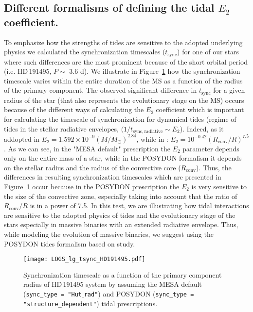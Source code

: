 \documentclass{aa}
\DeclareRobustCommand{\Figref}[1]{Figure~\ref{#1}}
\begin{document}
\begin{appendix}
\section{Different formalisms of defining the tidal $E_{2}$ coefficient.}
\label{sec:e2_def}
To emphasize how the strengths of tides are sensitive to the adopted underlying physics we calculated the synchronization timescales ($t_\mathrm{sync}$) for one of our stars where such differences are the most prominent because of the short orbital period (i.e. HD\,191495, $P \sim$ 3.6 d).
We illustrate in \Figref{fig:lg_tsync} how the synchronization timescale varies within the entire duration of the MS as a function of the radius of the primary component.
The observed significant difference in $t_\mathrm{sync}$ for a given radius of the star (that also represents the evolutionary stage on the MS) occurs because of the different ways of calculating the $E_{2}$ coefficient which is important for calculating the timescale of synchronization for dynamical tides (regime of tides in the stellar radiative envelopes, $(1/t_\mathrm{sync, radiative} \sim E_{2}$).
Indeed, as it addopted in \citet[]["MESA default" prescriprions]{Hurley_2002} $E_\mathrm{2} = 1.592 \times 10^{-9} (M/M_\mathrm{\odot})^{2.84}$, while in \citet[]["POSYDON" formalims for H-rich stars]{Qin_2018}: $E_\mathrm{2} = 10^{-0.42} (R_\mathrm{conv}/R)^{7.5}$.
As we can see, in the "MESA default" prescription the $E_\mathrm{2}$ parameter depends only on the entire mass of a star, while in the POSYDON formalism it depends on the stellar radius and the radius of the convective core ($R_\mathrm{conv}$).
Thus, the differences in resulting synchronization timescales which are presented in \Figref{fig:lg_tsync} occur because in the POSYDON prescription the $E_\mathrm{2}$ is very sensitive to the size of the convective zone, especially taking into account that the ratio of $R_\mathrm{conv}/R$ is in a power of 7.5.
In this test, we are illustrating how tidal interactions are sensitive to the adopted physics of tides and the evolutionary stage of the stars especially in massive binaries with an extended radiative envelope.
Thus, while modeling the evolution of massive binaries, we suggest using the POSYDON tides formalism based on \citet{Qin_2018} study.

\begin{figure}[!ht]
  \centering
  \texttt{[image: LOGS\_lg\_tsync\_HD191495.pdf]}
  \caption{Synchronization timescale as a function of the primary component radius of HD\,191495 system by assuming the MESA default (\texttt{sync\_type = "Hut$\_$rad"}) and POSYDON (\texttt{sync\_type = "structure\_dependent"}) tidal prescriptions.}
  \label{fig:lg_tsync}
\end{figure}






\end{appendix}
\end{document}
